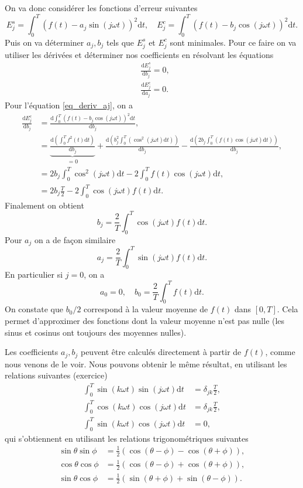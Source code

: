 \documentclass[a4paper,12pt]{book}
\newcommand{\dd}{\mathrm{d}}
\newcommand{\dDeriv}[2]{\frac{\dd #1}{\dd #2}}
\begin{document}
On va donc considérer les fonctions d'erreur suivantes
\begin{equation}
 E^s_j=\int_0^T(f(t)-a_j\sin(j\omega t))^2\dd t,\quad E^c_j=\int_0^T(f(t)-b_j\cos(j\omega t))^2\dd t.
\end{equation}
Puis on va déterminer $a_j,b_j$ tels que $E_j^s$ et $E_j^c$ sont minimales. Pour ce faire on va utiliser les dérivées
et déterminer nos coefficients en résolvant les équations
\begin{align}
 &\dDeriv{E^s_j}{b_j}=0,\label{eq_deriv_bj}\\
 &\dDeriv{E^c_j}{a_j}=0.\label{eq_deriv_aj}
\end{align}
Pour l'équation \eqref{eq_deriv_aj}, on a 
\begin{align}
 \dDeriv{E^c_j}{b_j}&=\dDeriv{\int_0^T(f(t)-b_j\cos(j\omega t))^2\dd t}{b_j},\nonumber\\
 &=\underbrace{\dDeriv{(\int_0^Tf^2(t)\dd t)}{b_j}}_{=0}+\dDeriv{(b_j^2\int_0^T(\cos^2(j\omega t)\dd t))}{b_j}-\dDeriv{(2b_j\int_0^T(f(t)\cos(j\omega t)\dd t))}{b_j},\nonumber\\
 &=2b_j\int_0^T\cos^2(j\omega t)\dd t-2\int_0^Tf(t)\cos(j\omega t)\dd t,\nonumber\\
 &=2b_j\frac{T}{2}-2\int_0^T\cos(j\omega t)f(t)\dd t.
\end{align}
Finalement on obtient
\begin{equation}
 b_j=\frac{2}{T}\int_0^T\cos(j\omega t)f(t)\dd t.
\end{equation}
Pour $a_j$ on a de façon similaire 
\begin{equation}
 a_j=\frac{2}{T}\int_0^T\sin(j\omega t)f(t)\dd t.
\end{equation}
En particulier si $j=0$, on a 
\begin{equation}
a_0=0,\quad b_0=\frac{2}{T}\int_0^T f(t)\dd t.
\end{equation}
On constate que $b_0/2$ correspond à la valeur moyenne de $f(t)$ dans $[0,T]$. Cela 
permet d'approximer des fonctions dont la valeur moyenne n'est pas nulle (les sinus et cosinus ont toujours
des moyennes nulles).

Les coefficients $a_j,b_j$ peuvent être calculés directement à partir de $f(t)$,
comme nous venons de le voir. Nous pouvons obtenir le même résultat, en utilisant les relations suivantes (exercice)
\begin{align}
 \int_0^T \sin(k \omega t)\sin(j \omega t)\dd t&=\delta_{jk} \frac{T}{2},\\
 \int_0^T \cos(k \omega t)\cos(j \omega t)\dd t&=\delta_{jk} \frac{T}{2},\\
 \int_0^T \sin(k \omega t)\cos(j \omega t)\dd t&=0,
\end{align}
qui s'obtiennent en utilisant les relations trigonométriques suivantes
\begin{align}
 \sin\theta\sin\phi&= \frac{1}{2}\left(\cos(\theta-\phi)-\cos(\theta+\phi)\right),\\
 \cos\theta\cos\phi&= \frac{1}{2}\left(\cos(\theta-\phi)+\cos(\theta+\phi)\right),\\
 \sin\theta\cos\phi&= \frac{1}{2}\left(\sin(\theta+\phi)+\sin(\theta-\phi)\right).
\end{align}
\end{document}
